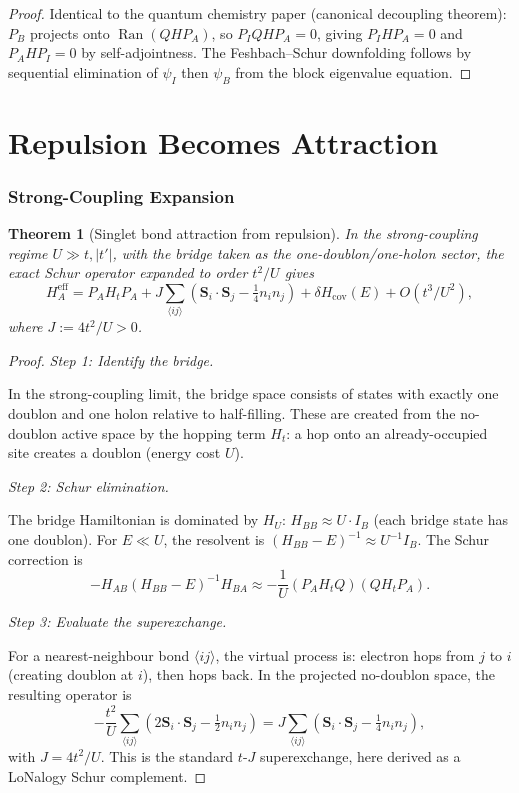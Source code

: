 \documentclass[12pt]{article}
\theoremstyle{plain}
\newtheorem{theorem}{Theorem}[section]
\theoremstyle{definition}
\numberwithin{equation}{section}
\newcommand{\eff}{\mathrm{eff}}
\DeclareMathOperator{\Ran}{Ran}
\begin{document}
\begin{proof}
Identical to the quantum chemistry paper (canonical decoupling
theorem): $P_B$ projects onto $\Ran(QHP_A)$, so
$P_I QHP_A=0$, giving $P_IHP_A=0$ and $P_AHP_I=0$ by
self-adjointness.  The Feshbach--Schur downfolding follows by
sequential elimination of $\psi_I$ then $\psi_B$ from the
block eigenvalue equation.
\end{proof}


\part{Repulsion Becomes Attraction}

\section{Strong-Coupling Expansion}\label{sec:strongcoupling}

\begin{theorem}[Singlet bond attraction from repulsion]\label{thm:attraction}
In the strong-coupling regime $U\gg t,|t'|$, with the bridge
taken as the one-doublon/one-holon sector, the exact Schur
operator expanded to order $t^2/U$ gives
\begin{equation}\label{eq:tJ}
H_A^{\eff} = P_A H_t P_A
+ J\sum_{\langle ij\rangle}
\left(\bm{S}_i\cdot\bm{S}_j
- \tfrac{1}{4}n_in_j\right)
+ \delta H_{\mathrm{cov}}(E)
+ O(t^3/U^2),
\end{equation}
where $J:=4t^2/U>0$.
\end{theorem}

\begin{proof}
\emph{Step 1: Identify the bridge.}

In the strong-coupling limit, the bridge space consists of states
with exactly one doublon and one holon relative to half-filling.
These are created from the no-doublon active space by the hopping
term $H_t$: a hop onto an already-occupied site creates a doublon
(energy cost $U$).

\emph{Step 2: Schur elimination.}

The bridge Hamiltonian is dominated by $H_U$:
$H_{BB}\approx U\cdot I_B$ (each bridge state has one doublon).
For $E\ll U$, the resolvent is
$(H_{BB}-E)^{-1}\approx U^{-1}I_B$.
The Schur correction is
\begin{equation}
-H_{AB}(H_{BB}-E)^{-1}H_{BA}
\approx -\frac{1}{U}(P_A H_t Q)(Q H_t P_A).
\end{equation}

\emph{Step 3: Evaluate the superexchange.}

For a nearest-neighbour bond $\langle ij\rangle$, the virtual
process is: electron hops from $j$ to $i$ (creating doublon at
$i$), then hops back.  In the projected no-doublon space, the
resulting operator is
\begin{equation}
-\frac{t^2}{U}\sum_{\langle ij\rangle}
\left(2\bm{S}_i\cdot\bm{S}_j
-\tfrac{1}{2}n_in_j\right)
= J\sum_{\langle ij\rangle}
\left(\bm{S}_i\cdot\bm{S}_j
-\tfrac{1}{4}n_in_j\right),
\end{equation}
with $J=4t^2/U$.  This is the standard $t$-$J$ superexchange,
here derived as a LoNalogy Schur complement.
\end{proof}
\end{document}
